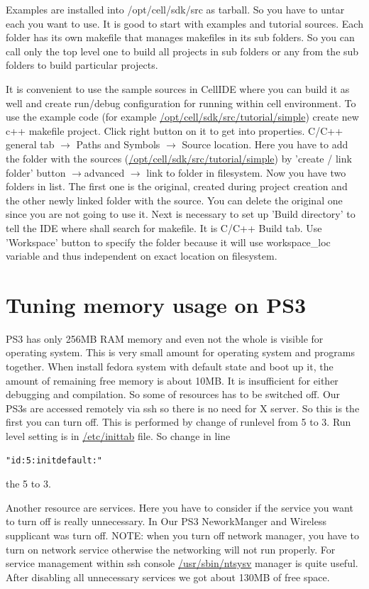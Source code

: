 Examples are installed into /opt/cell/sdk/src as tarball.
So you have to untar each you want to use.
It is good to start with examples and tutorial sources.
Each folder has its own makefile that manages makefiles in its sub folders.
So you can call only the top level one to build all projects in sub folders or any from the sub folders to build particular projects.

It is convenient to use the sample sources in CellIDE where you can build it as well and create run/debug configuration for running within cell environment.
To use the example code (for example \url{/opt/cell/sdk/src/tutorial/simple}) create new c++ makefile project.
Click right button on it to get into properties.
C/C++ general tab $\rightarrow$ Paths and Symbols $\rightarrow$ Source location.
Here you have to add the folder with the sources (\url{/opt/cell/sdk/src/tutorial/simple}) by 'create / link folder' button $\rightarrow$advanced $\rightarrow$ link to folder in filesystem.
Now you have two folders in list. The first one is the original, created during project creation and the other newly linked folder with the source.
You can delete the original one since you are not going to use it.
Next is necessary to set up 'Build directory' to tell the IDE where shall search for makefile.
It is C/C++ Build tab. Use 'Workspace' button to specify the folder because it will use workspace\_loc variable and thus independent on exact location on filesystem.

\section{Tuning memory usage on PS3}
\label{ps3MemoryUsage}

PS3 has only 256MB RAM memory and even not the whole is visible for operating system.
This is very small amount for operating system and programs together.
When install fedora system with default state and boot up it, the amount of remaining free memory is about 10MB.
It is insufficient for either debugging and compilation.
So some of resources has to be switched off.
Our PS3s are accessed remotely via ssh so there is no need for X server.
So this is the first you can turn off. This is performed by change of runlevel from 5 to 3.
Run level setting is in \url{/etc/inittab} file. So change in line
\begin{verbatim}
"id:5:initdefault:"
\end{verbatim}
the 5 to 3.

\par
Another resource are services.
Here you have to consider if the service you want to turn off is really unnecessary.
In Our PS3 NeworkManger and Wireless supplicant was turn off.
NOTE: when you turn off network manager, you have to turn on network service otherwise the networking will not run properly.
For service management within ssh console \url{/usr/sbin/ntsysv} manager is quite useful.
After disabling all unnecessary services we got about 130MB of free space.

